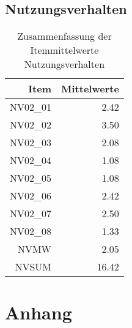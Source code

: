 \documentclass[12pt, bibliography=totoc]{scrartcl}
\begin{document}
\subsection{Nutzungsverhalten}\label{nutzungsverhalten}

\begin{table}[ht]
\centering
\caption{Zusammenfassung der Itemmittelwerte Nutzungsverhalten}
\begin{tabular}{rr}
  \hline
 Item & Mittelwerte\\
  \hline
NV02\_01 & 2.42 \\
  NV02\_02 & 3.50 \\
  NV02\_03 & 2.08 \\
  NV02\_04 & 1.08 \\
  NV02\_05 & 1.08 \\
  NV02\_06 & 2.42 \\
  NV02\_07 & 2.50 \\
  NV02\_08 & 1.33 \\
  NVMW & 2.05 \\
  NVSUM & 16.42 \\
   \hline
   \end{tabular}
   \end{table}

\pagebreak
\printbibliography
\pagebreak
\appendix


  \section{Anhang}
  


%
%
\end{document}
